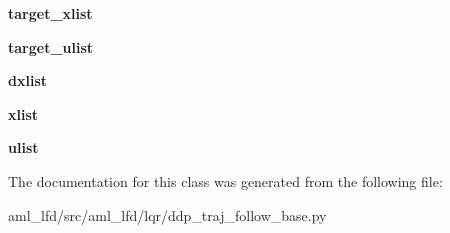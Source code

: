 \begin{DoxyCompactItemize}
\item 
\hypertarget{classaml__lfd_1_1lqr_1_1ddp__traj__follow__base_1_1_d_d_p_traj_follow_ac8045400042e1740c62cd987a5bd78be}{{\bfseries target\-\_\-xlist}}\label{classaml__lfd_1_1lqr_1_1ddp__traj__follow__base_1_1_d_d_p_traj_follow_ac8045400042e1740c62cd987a5bd78be}

\item 
\hypertarget{classaml__lfd_1_1lqr_1_1ddp__traj__follow__base_1_1_d_d_p_traj_follow_af8fb8b26f0014cc318a822a1ecce6859}{{\bfseries target\-\_\-ulist}}\label{classaml__lfd_1_1lqr_1_1ddp__traj__follow__base_1_1_d_d_p_traj_follow_af8fb8b26f0014cc318a822a1ecce6859}

\item 
\hypertarget{classaml__lfd_1_1lqr_1_1ddp__traj__follow__base_1_1_d_d_p_traj_follow_a6d2157818c66fe4ca6c57414262309a4}{{\bfseries dxlist}}\label{classaml__lfd_1_1lqr_1_1ddp__traj__follow__base_1_1_d_d_p_traj_follow_a6d2157818c66fe4ca6c57414262309a4}

\item 
\hypertarget{classaml__lfd_1_1lqr_1_1ddp__traj__follow__base_1_1_d_d_p_traj_follow_a737296883bc4be3b617e584833125ed3}{{\bfseries xlist}}\label{classaml__lfd_1_1lqr_1_1ddp__traj__follow__base_1_1_d_d_p_traj_follow_a737296883bc4be3b617e584833125ed3}

\item 
\hypertarget{classaml__lfd_1_1lqr_1_1ddp__traj__follow__base_1_1_d_d_p_traj_follow_a23c501383ace126e72954a4e9e3138f1}{{\bfseries ulist}}\label{classaml__lfd_1_1lqr_1_1ddp__traj__follow__base_1_1_d_d_p_traj_follow_a23c501383ace126e72954a4e9e3138f1}

\end{DoxyCompactItemize}


The documentation for this class was generated from the following file\-:\begin{DoxyCompactItemize}
\item 
aml\-\_\-lfd/src/aml\-\_\-lfd/lqr/ddp\-\_\-traj\-\_\-follow\-\_\-base.\-py\end{DoxyCompactItemize}
